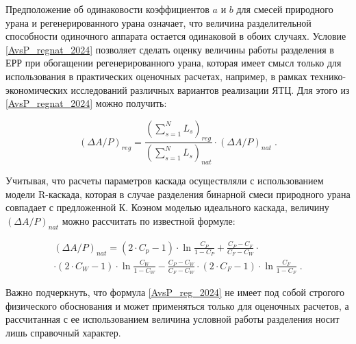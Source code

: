 Предположение об одинаковости коэффициентов $a$ и $b$ для смесей природного урана и регенерированного урана означает, что величина разделительной способности одиночного аппарата остается одинаковой в обоих случаях. Условие \ref{AvsP_regnat_2024} позволяет сделать оценку величины работы разделения в ЕРР при обогащении регенерированного урана, которая имеет смысл только для использования в практических оценочных расчетах, например, в рамках технико-экономических исследований различных вариантов реализации ЯТЦ. Для этого из \ref{AvsP_regnat_2024} можно получить:

\begin{equation}\label{AvsP_reg_2024}
  (\Delta A/P)_{reg}=\frac{(\sum_{s=1}^N L_s)_{reg}}{(\sum_{s=1}^N L_s)_{nat}} \cdot (\Delta A/P)_{nat} \; .
\end{equation}

Учитывая, что расчеты параметров каскада осуществляли с использованием модели R-каскада, которая в случае разделения бинарной смеси природного урана совпадает с предложенной К. Коэном моделью идеального каскада, величину $(\Delta A/P)_{nat}$ можно рассчитать по известной формуле:

\begin{equation}\label{kohen_2024}
  \begin{gathered}
    (\Delta A/P)_{nat}=\left(2 \cdot C_p-1\right) \cdot \ln \frac{C_P}{1-C_P}+\frac{C_P-C_F}{C_F-C_W} \cdot \\
    \cdot \left(2 \cdot C_W-1\right) \cdot \ln \frac{C_W}{1-C_W}-\frac{C_P-C_W}{C_F-C_W} \cdot \left(2 \cdot C_F-1\right) \cdot \ln \frac{C_F}{1-C_F} \; .
  \end{gathered}
\end{equation}

Важно подчеркнуть, что формула \ref{AvsP_reg_2024} не имеет под собой строгого физического обоснования и может  применяться только для оценочных расчетов, а рассчитанная с ее использованием величина условной работы разделения носит лишь справочный характер.

  
